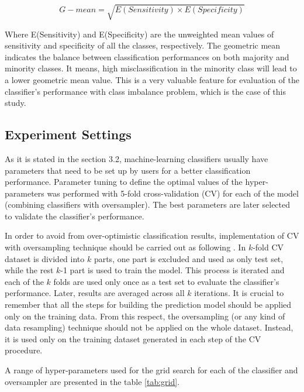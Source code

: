 \documentclass[parskip=full]{scrartcl}
\begin{document}
\[
G{-}mean = \sqrt{E(Sensitivity) \times E(Specificity)}
\]

Where E(Sensitivity) and E(Specificity) are the unweighted mean values of
sensitivity and specificity of all the classes, respectively. The geometric
mean indicates the balance between classification performances on both majority
and minority classes. It means, high misclassification in the minority class
will lead to a lower geometric mean value. This is a very valuable feature for
evaluation of the classifier's performance with class imbalance problem, which
is the case of this study.


\subsection{Experiment Settings}

As it is stated in the section 3.2, machine-learning classifiers usually have
parameters that need to be set up by users for a better classification
performance. Parameter tuning to define the optimal values of the
hyper-parameters was performed with 5-fold cross-validation (CV) for each of
the model (combining classifiers with oversampler). The best parameters are
later selected to validate the classifier's performance.

In order to avoid from over-optimistic classification results, implementation
of CV with oversampling technique should be carried out as following
\cite{Lusa2015}. In $k$-fold CV dataset is divided into $k$ parts, one part is
excluded and used as only test set, while the rest $k$-1 part is used to train
the model. This process is iterated and each of the $k$ folds are used only
once as a test set to evaluate the classifier's performance. Later, results are
averaged across all $k$ iterations. It is crucial to remember that
all the steps for building the prediction model should be applied only on the
training data. From this respect, the oversampling (or any kind of data
resampling) technique should not be applied on the whole dataset. Instead, it
is used only on the training dataset generated in each step of the CV
procedure.

A range of hyper-parameters used for the grid search for each of the
classifier and oversampler are presented in the table \ref{tab:grid}.
\end{document}
